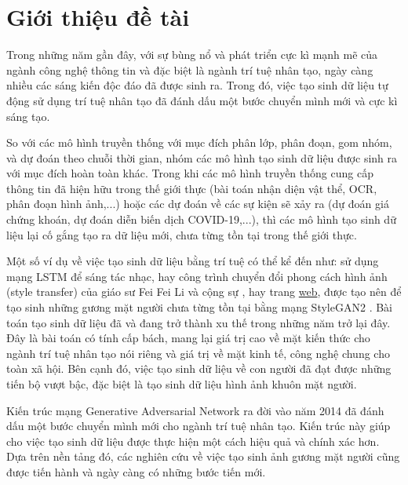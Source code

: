 \chapter{Giới thiệu đề tài}

Trong những năm gần đây, với sự bùng nổ và phát triển cực kì mạnh mẽ của ngành công nghệ thông tin và đặc biệt là ngành trí tuệ nhân tạo, ngày càng nhiều các sáng kiến độc đáo đã được sinh ra. Trong đó, việc tạo sinh dữ liệu tự động sử dụng trí tuệ nhân tạo đã đánh dấu một bước chuyển mình mới và cực kì sáng tạo.

So với các mô hình truyền thống với mục đích phân lớp, phân đoạn, gom nhóm, và dự đoán theo chuỗi thời gian, nhóm các mô hình tạo sinh dữ liệu được sinh ra với mục đích hoàn toàn khác. Trong khi các mô hình truyền thống cung cấp thông tin đã hiện hữu trong thế giới thực (bài toán nhận diện vật thể, OCR, phân đoạn hình ảnh,...) hoặc các dự đoán về các sự kiện sẽ xảy ra (dự đoán giá chứng khoán, dự đoán diễn biến dịch COVID-19,...), thì các mô hình tạo sinh dữ liệu lại cố gắng tạo ra dữ liệu mới, chưa từng tồn tại trong thế giới thực.

Một số ví dụ về việc tạo sinh dữ liệu bằng trí tuệ có thể kể đến như: sử dụng mạng LSTM \cite{lstm} để sáng tác nhạc, hay công trình chuyển đổi phong cách hình ảnh (style transfer) của giáo sư Fei Fei Li và cộng sự \cite{Johnson2016Perceptual}, hay trang \href{https://thispersondoesnotexist.com}{web}, được tạo nên để tạo sinh những gương mặt người chưa từng tồn tại bằng mạng StyleGAN2 \cite{stylegans}. Bài toán tạo sinh dữ liệu \cite{synthetic_data} đã và đang trở thành xu thế trong những năm trở lại đây. Đây là bài toán có tính cấp bách, mang lại giá trị cao về mặt kiến thức cho ngành trí tuệ nhân tạo nói riêng và giá trị về mặt kinh tế, công nghệ chung cho toàn xã hội. Bên cạnh đó, việc tạo sinh dữ liệu về con người đã đạt được những tiến bộ vượt bậc, đặc biệt là tạo sinh dữ liệu hình ảnh khuôn mặt người.

Kiến trúc mạng Generative Adversarial Network \cite{gans_base} ra đời vào năm 2014 đã đánh dấu một bước chuyển mình mới cho ngành trí tuệ nhân tạo. Kiến trúc này giúp cho việc tạo sinh dữ liệu được thực hiện một cách hiệu quả và chính xác hơn. Dựa trên nền tảng đó, các nghiên cứu về việc tạo sinh ảnh gương mặt người cũng được tiến hành và ngày càng có những bước tiến mới.

